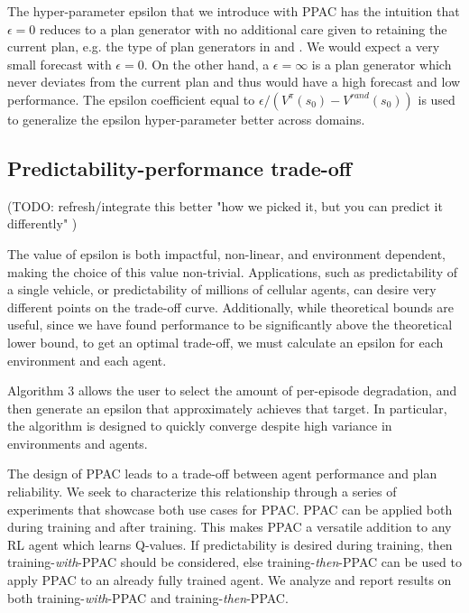 \documentclass{article}
\begin{document}
            The hyper-parameter epsilon that we introduce with PPAC has the intuition that $\epsilon=0$ reduces to a plan generator with no additional care given to retaining the current plan, e.g. the type of plan generators in \cite{racaniere2017imagination} and \cite{kim2020communication}. We would expect a very small forecast with $\epsilon=0$. On the other hand, a $\epsilon=\infty$ is a plan generator which never deviates from the current plan and thus would have a high forecast and low performance. The epsilon coefficient equal to $\epsilon / (V^{\pi}(s_0)-V^{rand}(s_0))$ is used to generalize the epsilon hyper-parameter better across domains.



        \subsection{Predictability-performance trade-off}
            
            (TODO: refresh/integrate this better "how we picked it, but you can predict it differently" )

            The value of epsilon is both impactful, non-linear, and environment dependent, making the choice of this value non-trivial. Applications, such as predictability of a single vehicle, or predictability of millions of cellular agents, can desire very different points on the trade-off curve. Additionally, while theoretical bounds are useful, since we have found performance to be significantly above the theoretical lower bound, to get an optimal trade-off, we must calculate an epsilon for each environment and each agent.  

            Algorithm 3 allows the user to select the amount of per-episode degradation, and then generate an epsilon that approximately achieves that target. In particular, the algorithm is designed to quickly converge despite high variance in environments and agents. 
            
            The design of PPAC leads to a trade-off between agent performance and plan reliability. We seek to characterize this relationship through a series of experiments that showcase both use cases for PPAC. PPAC can be applied both during training and after training. This makes PPAC a versatile addition to any RL agent which learns Q-values. If predictability is desired during training, then training-\textit{with}-PPAC should be considered, else training-\textit{then}-PPAC can be used to apply PPAC to an already fully trained agent. We analyze and report results on both training-\textit{with}-PPAC and training-\textit{then}-PPAC.
\end{document}
